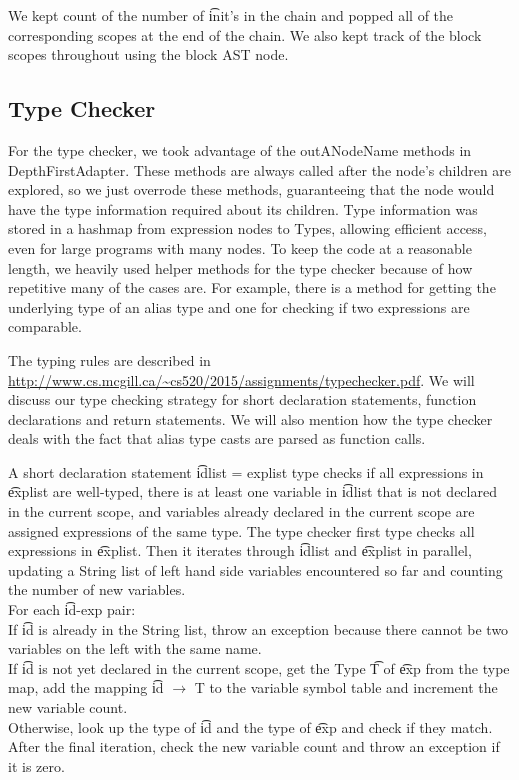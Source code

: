 \documentclass[11pt]{article}
\begin{document}
We kept count of the number of \t{init}'s in the chain and popped all of the corresponding scopes at the end of the chain. We also kept track of the block scopes throughout using the block AST node.

\subsection{Type Checker}
For the type checker, we took advantage of the outANodeName methods in DepthFirstAdapter. These methods are always called after the node's children are explored, so we just overrode these methods, guaranteeing that the node would have the type information required about its children. Type information was stored in a hashmap from expression nodes to Types, allowing efficient access, even for large programs with many nodes. To keep the code at a reasonable length, we heavily used helper methods for the type checker because of how repetitive many of the cases are. For example, there is a method for getting the underlying type of an alias type and one for checking if two expressions are comparable. 

The typing rules are described in \url{http://www.cs.mcgill.ca/~cs520/2015/assignments/typechecker.pdf}. We will discuss our type checking strategy for short declaration statements, function declarations and return statements. We will also mention how the type checker deals with the fact that alias type casts are parsed as function calls.

A short declaration statement \t{idlist = explist} type checks if all expressions in \t{explist} are well-typed, there is at least one variable in \t{idlist} that is not declared in the current scope, and variables already declared in the current scope are assigned expressions of the same type. The type checker first type checks all expressions in \t{explist}. Then it iterates through \t{idlist} and \t{explist} in parallel, updating a String list of left hand side variables encountered so far and counting the number of new variables.\\ For each \t{id-exp} pair: \\
\indent If \t{id} is already in the String list, throw an exception because there cannot be two variables \indent on the left with the same name. \\
\indent If \t{id} is not yet declared in the current scope, get the Type \t{T} of \t{exp} from the type map, add \indent the mapping \t{id $\rightarrow$ T} to the variable symbol table and increment the new variable count. \\
\indent Otherwise, look up the type of \t{id} and the type of \t{exp} and check if they match. \\
After the final iteration, check the new variable count and throw an exception if it is zero.
\end{document}
